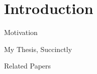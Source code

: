 \section{Introduction}

\begin{frame}{Motivation}

\end{frame}


\begin{frame}{My Thesis, Succinctly}
	
\end{frame}

\begin{frame}{Related Papers}
	
\end{frame}


